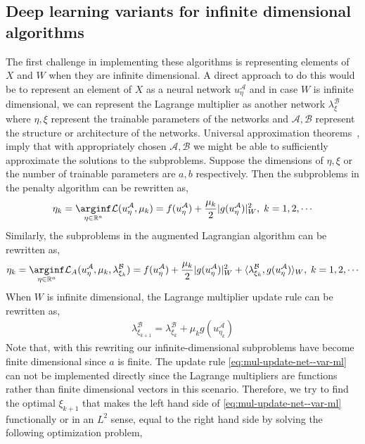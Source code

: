 \subsection{Deep learning variants for infinite dimensional algorithms}
The first challenge in implementing these algorithms is representing elements of $X$ and $W$ when they are infinite dimensional. A direct approach to do this would be to represent an element of $X$ as a neural network $u_{\eta}^\mathcal{A}$  and in case $W$ is infinite dimensional, we can represent the Lagrange multiplier as another network $\lambda_\xi^\mathcal{B}$ where $\eta, \xi$ represent the trainable parameters of the networks and $\mathcal A, \mathcal B$ represent the structure or architecture of the networks. Universal approximation theorems~\cite{pinkus1999approximation}, \cite{de2021approximation} imply that with appropriately chosen $\mathcal A, \mathcal B$ we might be able to sufficiently approximate the solutions to the subproblems. Suppose the dimensions of $\eta, \xi$ or the number of trainable parameters are $a, b$ respectively. Then the subproblems in the penalty algorithm can be rewritten as,
\begin{align}
    \eta_k=\underset{\eta\in \mathbb R^a}\arginf \mathcal L(u_{\eta}^{\mathcal A}, \mu_k)=f(u_{\eta}^{\mathcal A}) + \frac{\mu_k}{2}|g(u_{\eta}^{\mathcal A})|_W^2,\;k=1,2,\cdots\label{eq:seq-uncon-net--var-ml}
\end{align}
Similarly, the subproblems in the augmented Lagrangian algorithm can be rewritten as, 
\begin{align}
    \eta_k=\underset{\eta\in \mathbb R^a}\arginf \mathcal L_A(u_{\eta}^{\mathcal A}, \mu_k, \lambda_{\xi_k}^{\mathcal B})=f(u_{\eta}^{\mathcal A}) + \frac{\mu_k}{2}|g(u_{\eta}^{\mathcal A})|_W^2 + \langle\lambda_{\xi_k}^{\mathcal B}, g(u_{\eta}^{\mathcal A})\rangle_W,\;k=1,2,\cdots\label{eq:seq-uncon-al-net--var-ml}
    \end{align}
When $W$ is infinite dimensional, the Lagrange multiplier update rule can be rewritten as,
\begin{align}
\lambda_{\xi_{k+1}}^{\mathcal B} = \lambda_{\xi_k}^{\mathcal B} + \mu_k g(u_{\eta_k}^{\mathcal A})\label{eq:mul-update-net--var-ml}
\end{align}
 Note that, with this rewriting our infinite-dimensional subproblems have become finite dimensional since $a$ is finite. The update rule \eqref{eq:mul-update-net--var-ml} can not be implemented directly since the Lagrange multipliers are functions rather than finite dimensional vectors in this scenario. Therefore, we try to find the optimal $\xi_{k+1}$ that makes the left hand side of \eqref{eq:mul-update-net--var-ml} functionally or in an $L^2$ sense, equal to the right hand side by solving the following optimization problem, 
